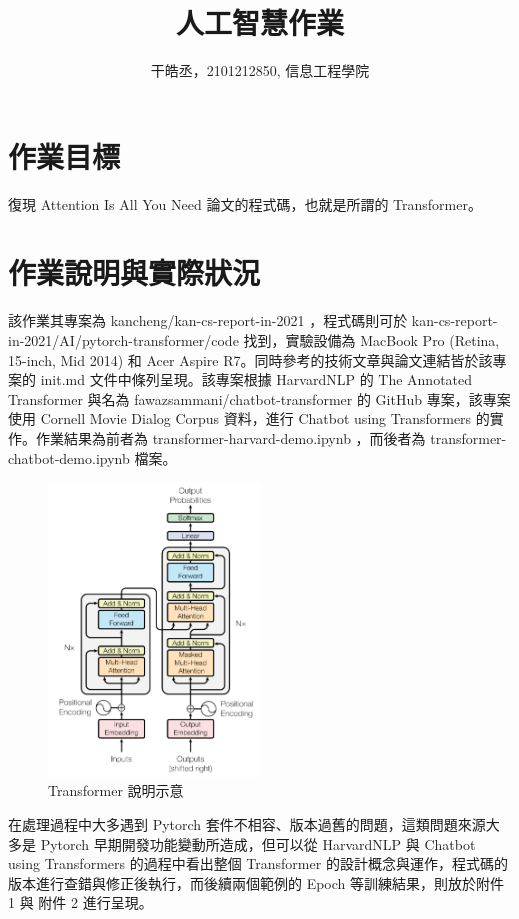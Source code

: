 \documentclass[10pt,UTF8]{ctexart}
\title{人工智慧作業}
\author{干皓丞，2101212850, 信息工程學院}
\begin{document}
\maketitle


\section{作業目標}

復現 Attention Is All You Need 論文的程式碼，也就是所謂的 Transformer。

\section{作業說明與實際狀況}

該作業其專案為 kancheng/kan-cs-report-in-2021 ，程式碼則可於 kan-cs-report-in-2021/AI/pytorch-transformer/code 找到，實驗設備為 MacBook Pro (Retina, 15-inch, Mid 2014) 和 Acer Aspire R7。同時參考的技術文章與論文連結皆於該專案的 init.md 文件中條列呈現。該專案根據 HarvardNLP 的 The Annotated Transformer 與名為 fawazsammani/chatbot-transformer 的 GitHub 專案，該專案使用 Cornell Movie Dialog Corpus 資料，進行 Chatbot using Transformers 的實作。作業結果為前者為 transformer-harvard-demo.ipynb ，而後者為 transformer-chatbot-demo.ipynb 檔案。

\begin{figure}[H]
\centering 
\includegraphics[width=0.50\textwidth]{ai1.png} 
\caption{Transformer 說明示意}
\label{Test}
\end{figure}

在處理過程中大多遇到 Pytorch 套件不相容、版本過舊的問題，這類問題來源大多是  Pytorch 早期開發功能變動所造成，但可以從 HarvardNLP 與 Chatbot using Transformers 的過程中看出整個 Transformer 的設計概念與運作，程式碼的版本進行查錯與修正後執行，而後續兩個範例的 Epoch 等訓練結果，則放於附件 1 與 附件 2 進行呈現。
\end{document}
